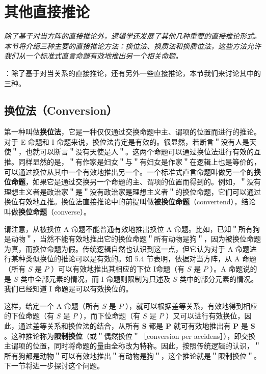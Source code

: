 \section{其他直接推论}

\begin{logicbox}[title=引言]
\textit{除了基于对当方阵的直接推论外，逻辑学还发展了其他几种重要的直接推论形式。本节将介绍三种主要的直接推论方法：换位法、换质法和换质位法，这些方法允许我们从一个标准式直言命题有效地推出另一个相关命题。}
\end{logicbox}

：除了基于对当关系的直接推论，还有另外一些直接推论，本节我们来讨论其中的三种。

\subsection{换位法（Conversion）}
第一种叫做\textbf{换位法}，它是一种仅仅通过交换命题中主、谓项的位置而进行的推论。对于 E 命题和 I 命题来说，换位法肯定是有效的。很显然，若断言＂没有人是天使＂，也就可以断言＂没有天使是人＂。这两个命题可以通过换位法进行有效的互推。同样显然的是，＂有作家是妇女＂与＂有妇女是作家＂在逻辑上也是等价的，可以通过换位从其中一个有效地推出另一个。一个标准式直言命题叫做另一个的\textbf{换位命题}，如果它是通过交换另一个命题的主、谓项的位置而得到的。例如，＂没有理想主义者是政治家＂是＂没有政治家是理想主义者＂的换位命题，它们可以通过换位有效地互推。换位法直接推论中的前提叫做\textbf{被换位命题}（convertend），结论叫做\textbf{换位命题}（converse）。

请注意，从被换位 A 命题不能普通有效地推出换位 A 命题。比如，已知＂所有狗是动物＂，当然不能有效地推出它的换位命题＂所有动物是狗＂，因为被换位命题为真，而换位命题为假。传统逻辑自然也认识到这一点，但它认为对于 A 命题进行某种类似换位的推论可以是有效的。如 5.4 节表明，依据对当方阵，从 A 命题（所有 $S$ 是 $P$ ）可以有效地推出其相应的下位 I命题（有 $S$ 是 $P$ ）。A 命题说的是 $S$ 类中全部元素的情况，而 I 命题则限制为只述及 $S$ 类中的部分元素的情况。我们已经知道 I 命题是可以有效换位的。

这样，给定一个 A 命题（所有 $S$ 是 $P$ ），就可以根据差等关系，有效地得到相应的下位命题（有 $S$ 是 $P$ ），而下位命题（有 $S$ 是 $P$ ）又可以进行有效换位，因此，通过差等关系和换位法的结合，从所有 $\boldsymbol{S}$ 都是 $\boldsymbol{P}$ 就可有效地推出有 $\boldsymbol{P}$ 是 $\boldsymbol{S}$ 。这种推论称为\textbf{限制换位}（或＂偶然换位＂［conversion per accidens］），即交换主谓项的位置，同时将命题的量由全称改为特称。因此，按照传统逻辑的认识，＂所有狗都是动物＂可以有效地推出＂有动物是狗＂，这个推论就是＂限制换位＂。下一节将进一步探讨这个问题。

